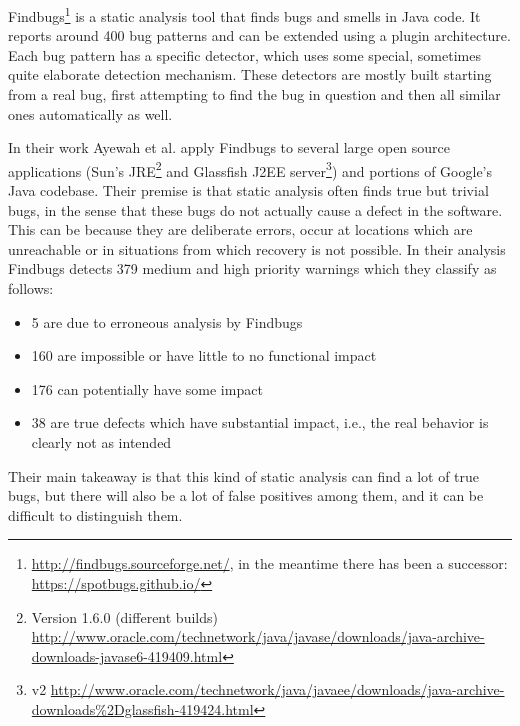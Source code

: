 Findbugs\footnote{\url{http://findbugs.sourceforge.net/}, in the meantime there has been a successor: \url{https://spotbugs.github.io/}} is a static analysis tool that finds bugs and smells in Java code.
It reports around 400 bug patterns and can be extended using a plugin architecture.
Each bug pattern has a specific detector, which uses some special, sometimes quite elaborate detection mechanism.
These detectors are mostly built starting from a real bug, first attempting to find the bug in question and then all similar ones automatically as well.

In their work Ayewah et al. \cite{ayewah2007evaluating} apply Findbugs to several large open source applications
(Sun's JRE\footnote{Version 1.6.0 (different builds) \url{http://www.oracle.com/technetwork/java/javase/downloads/java-archive-downloads-javase6-419409.html}}
and Glassfish J2EE server\footnote{v2 \url{http://www.oracle.com/technetwork/java/javaee/downloads/java-archive-downloads\%2Dglassfish-419424.html}})
and portions of Google's Java codebase.
Their premise is that static analysis often finds true but trivial bugs, in the sense that these bugs do not actually cause a defect in the software.
This can be because they are deliberate errors, occur at locations which are unreachable or in situations from which recovery is not possible.
In their analysis Findbugs detects 379 medium and high priority warnings which they classify as follows:
\begin{itemize}
    \item 5 are due to erroneous analysis by Findbugs
    \item 160 are impossible or have little to no functional impact
    \item 176 can potentially have some impact
    \item 38 are true defects which have substantial impact, i.e., the real behavior is clearly not as intended
\end{itemize}
Their main takeaway is that this kind of static analysis can find a lot of true bugs, but there will also be a lot of false positives among them, and it can be difficult to distinguish them.

